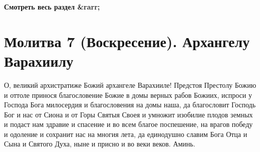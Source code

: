 \mychapterending


\bfseries Смотреть весь раздел &rarr;\normalfont{} 

\section{Молитва 7 (Воскресение).    Архангелу Варахиилу}
 


О, великий архистратиже Божий архангеле Варахииле! Предстоя Престолу Божию и оттоле принося благословение Божие в домы верных рабов Божиих, испроси у Господа Бога милосердия и благословения на домы наша, да благословит Господь Бог и нас от Сиона и от Горы Святыя Своея и умножит изобилие плодов земных и подаст нам здравие и спасение и во всем благое поспешение, на врагов победу и одоление и сохранит нас на многия лета, да единодушно славим Бога Отца и Сына и Святого Духа, ныне и присно и во веки веков. Аминь.


\mychapterending